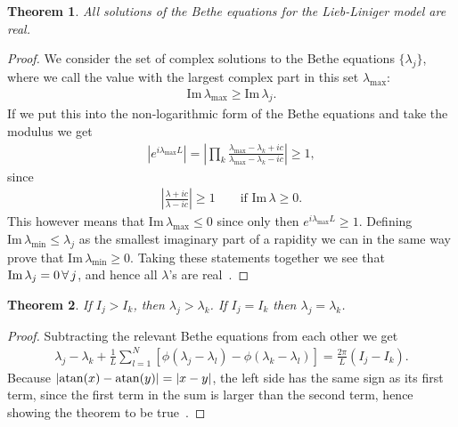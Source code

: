 \documentclass[11pt, a4paper]{report} %
\newtheorem{theorem}{Theorem}
\begin{document}
\begin{theorem}
All solutions of the Bethe equations for the Lieb-Liniger model are real.
\end{theorem}

\begin{proof}
We consider the set of complex solutions to the Bethe equations \(\{\lambda_j\}\), where we call the value with the largest complex part in this set \(\lambda_{\max}\):
\begin{align}
\textrm{Im} \, \lambda_{\max} \geq \textrm{Im} \, \lambda_j.
\end{align}
If we put this into the non-logarithmic form of the Bethe equations and take the modulus we get
\begin{align}
  \left| e^{i\lambda_{\max} L} \right|= \left| \prod_k \frac{\lambda_{\max} - \lambda_k + ic}{\lambda_{\max} - \lambda_k - ic} \right|\geq 1,
\end{align}
since
\begin{align}
\left|\frac{\lambda+ic}{\lambda-ic} \right| \geq 1 \qquad \textrm{if Im}\, \lambda \geq 0.
\end{align}
This however means that \(\textrm{Im}\, \lambda_{\max} \leq 0\) since only then \(e^{i\lambda_{\max}L} \geq 1\).
Defining \(\textrm{Im}\,\lambda_{\min}\leq \lambda_j\) as the smallest imaginary part of a rapidity we can in the same way prove that \(\textrm{Im}\,\lambda_{\min} \geq 0\).
Taking these statements together we see that \(\textrm{Im}\, \lambda_{j}=0\textrm{\,}\forall\textrm{\,} j\), and hence all  \(\lambda\)'s are real~\cite{Korepin1993}.
\end{proof}

\begin{theorem}
If \(I_j >I_k\), then \(\lambda_j > \lambda_k\). If \(I_j=I_k\) then \(\lambda_j=\lambda_k\).
\end{theorem}

\begin{proof}
Subtracting the relevant Bethe equations from each other we get
\begin{align}
  \lambda_j - \lambda_k + \frac{1}{L}\sum_{l=1}^N \left[\phi(\lambda_j - \lambda_l) - \phi(\lambda_k - \lambda_l)\right] = \frac{2\pi}{L} (I_j - I_k).
\end{align}
Because \(\abs{\atan(x)-\atan(y)}=\abs{x-y}\), the left side has the same sign as its first term, since the first term in the sum is larger than the second term, hence showing the theorem to be true~\cite{Korepin1993,Gaudin2009}.
\end{proof}
\end{document}
